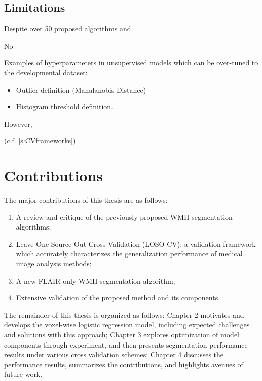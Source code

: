 \subsection{Limitations}\label{ss:priorlimits}
Despite over 50 proposed algorithms and 

No 




Examples of hyperparameters in unsupervised models which can be over-tuned to the developmental dataset:
\begin{itemize}
  \item Outlier definition (Mahalanobis Distance)
  \item Histogram threshold definition.
\end{itemize}

However, 

(c.f. \ref{s:CVframeworks})


\clearpage
\section{Contributions}
The major contributions of this thesis are as follows:
\begin{enumerate}
  \item A review and critique of the previously proposed WMH segmentation algorithms;
  \item Leave-One-Source-Out Cross Validation (LOSO-CV): a validation framework which accurately characterizes the generalization performance of medical image analysis methods;
  \item A new FLAIR-only WMH segmentation algorithm;
  \item Extensive validation of the proposed method and its components.
\end{enumerate}
The remainder of this thesis is organized as follows:
Chapter 2 motivates and develops the voxel-wise logistic regression model, including expected challenges and solutions with this approach;
Chapter 3 explores optimization of model components through experiment, and then presents segmentation performance results under various cross validation schemes;
Chapter 4 discusses the performance results, summarizes the contributions, and highlights avenues of future work.

